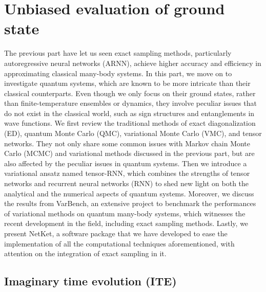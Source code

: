 \chapter{Unbiased evaluation of ground state}

The previous part have let us seen exact sampling methods, particularly autoregressive neural networks (ARNN), achieve higher accuracy and efficiency in approximating classical many-body systems. In this part, we move on to investigate quantum systems, which are known to be more intricate than their classical counterparts. Even though we only focus on their ground states, rather than finite-temperature ensembles or dynamics, they involve peculiar issues that do not exist in the classical world, such as sign structures and entanglements in wave functions. We first review the traditional methods of exact diagonalization (ED), quantum Monte Carlo (QMC), variational Monte Carlo (VMC), and tensor networks. They not only share some common issues with Markov chain Monte Carlo (MCMC) and variational methods discussed in the previous part, but are also affected by the peculiar issues in quantum systems. Then we introduce a variational ansatz named tensor-RNN, which combines the strengths of tensor networks and recurrent neural networks (RNN) to shed new light on both the analytical and the numerical aspects of quantum systems. Moreover, we discuss the results from VarBench, an extensive project to benchmark the performances of variational methods on quantum many-body systems, which witnesses the recent development in the field, including exact sampling methods. Lastly, we present NetKet, a software package that we have developed to ease the implementation of all the computational techniques aforementioned, with attention on the integration of exact sampling in it.

\section{Imaginary time evolution (ITE)}

